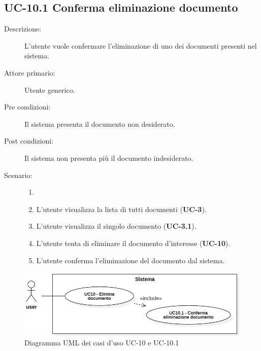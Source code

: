 \subsection{UC-10.1 Conferma eliminazione documento}
\begin{description}
    \item[Descrizione:] L'utente vuole confermare l'eliminazione di uno dei documenti presenti nel sistema.
    \item[Attore primario:] Utente generico.
    \item[Pre condizioni:] Il sistema presenta il documento non desiderato.
    \item[Post condizioni:] Il sistema non presenta più il documento indesiderato.
    \item[Scenario:] 
    \begin{enumerate}
        \item[]
        \item L’utente visualizza la lista di tutti documenti (\textbf{UC-3}).
        \item L'utente visualizza il singolo documento (\textbf{UC-3.1}).
        \item L'utente tenta di eliminare il documento d'interesse (\textbf{UC-10}).
        \item L'utente conferma l'eliminazione del documento dal sistema.
    \end{enumerate}
    
\end{description}

\begin{figure}[H]
    \centering
    \includegraphics[width=0.8\linewidth]{UC10.PNG} %
    \caption{Diagramma UML dei casi d'uso UC-10 e UC-10.1}
    \label{fig:UC10-11}
\end{figure}

